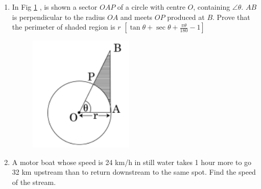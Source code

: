 \documentclass[book,11pt,onecolumn]{IEEEtran}
\renewcommand\thesection{\arabic{section}}
\begin{document}
\begin{enumerate}[label=\thesection.\arabic*.,ref=\thesection.\theenumi]
\item In Fig  \ref{figure_9} , is shown a sector $OAP$ of a circle with centre $O$, containing $\angle \theta$. $AB$ is perpendicular to the radius $OA$ and meets $OP$ produced at $B$. Prove that the perimeter of shaded region is $r$ $\left[\tan \theta + \sec \theta + \frac{\pi \theta}{180}-1 \right] $ \\

	\begin{figure}[H]
      \centering
      \includegraphics[width=5cm]{figs/9.png}
     \caption{}
     \label{figure_9}
\end{figure} 


\item A motor boat whose speed is 24 km/h in still water takes 1 hour more to go 32 km upstream than to return downstream to the same spot. Find the speed of the stream.\\
\end{enumerate}
\end{document}
